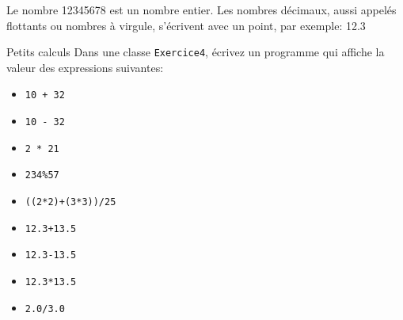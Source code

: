 \documentclass[a4paper,11pt]{article}
\begin{document}
	Le nombre 12345678 est un nombre entier. Les nombres décimaux, aussi appelés flottants ou nombres à virgule, s'écrivent avec un point, par exemple: 12.3


	\begin{Exercice}{Petits calculs}
		Dans une classe \texttt{Exercice4}, écrivez un programme qui affiche la valeur
		des expressions	suivantes:
		\begin{itemize}
			\item \texttt{10 + 32}
			\item \texttt{10 - 32}
			\item \texttt{2 * 21}
			\item \texttt{234\%57}
			\item \texttt{((2*2)+(3*3))/25}	
			\item \texttt{12.3+13.5}
			\item \texttt{12.3-13.5}
			\item \texttt{12.3*13.5}
			\item \texttt{2.0/3.0}
		\end{itemize}
		
	\end{Exercice}
	
\end{document}
